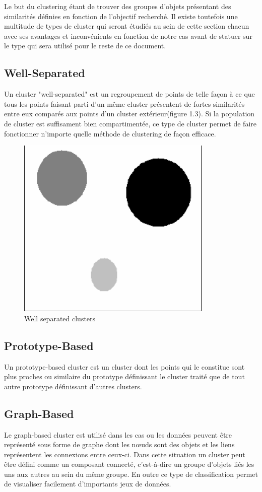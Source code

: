 \documentclass[memoire.tex]{subfiles}
\begin{document}
Le but du clustering étant de trouver des groupes d'objets présentant des similarités
définies en fonction de l'objectif recherché. Il existe toutefois une multitude de types de cluster qui seront étudiés au sein de cette section chacun avec ses avantages et inconvénients en fonction de notre cas avant de statuer sur le type qui sera utilisé pour le reste de ce document.

\subsection{Well-Separated}
Un cluster "well-separated" est un regroupement de points de telle façon à ce que tous les points faisant parti d'un même cluster présentent de fortes similarités entre eux comparés aux points d'un cluster extérieur(figure 1.3). Si la population de cluster est suffisament bien compartimentée, ce type de cluster permet de faire fonctionner n'importe quelle méthode de clustering de façon efficace.
	\begin{figure}[h!]
		\centerline{\includegraphics[scale=0.8]{img/well_separated.png}}
		\caption{Well separated clusters}
	\end{figure}

\subsection{Prototype-Based}
Un prototype-based cluster est un cluster dont les points qui le constitue sont plus proches ou similaire du prototype définissant le cluster traité que de tout autre prototype définissant d'autres clusters.

\subsection{Graph-Based}
Le graph-based cluster est utilisé dans les cas ou les données peuvent être représenté sous forme de graphe dont les nœuds sont des objets et les liens représentent les connexions entre ceux-ci. Dans cette situation un cluster peut être défini comme un composant connecté,  c'est-à-dire un groupe d'objets liés les uns aux autres au sein du même groupe. En outre ce type de classification permet de visualiser facilement d'importants jeux de données.
\end{document}
